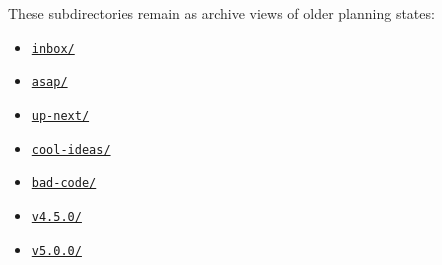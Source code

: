 These subdirectories remain as archive views of older planning states:

\begin{itemize}
\tightlist
\item
  \href{https://github.com/flyingrobots/bijou/blob/cbd70612140e7a450d764b3c7be1c6af878b99bc/docs/method/graveyard/legacy-backlog/inbox/README.md}{\texttt{i\allowbreak{}n\allowbreak{}b\allowbreak{}o\allowbreak{}x\allowbreak{}/}}
\item
  \href{https://github.com/flyingrobots/bijou/blob/cbd70612140e7a450d764b3c7be1c6af878b99bc/docs/method/graveyard/legacy-backlog/asap/README.md}{\texttt{a\allowbreak{}s\allowbreak{}a\allowbreak{}p\allowbreak{}/}}
\item
  \href{https://github.com/flyingrobots/bijou/blob/cbd70612140e7a450d764b3c7be1c6af878b99bc/docs/method/graveyard/legacy-backlog/up-next/README.md}{\texttt{u\allowbreak{}p\allowbreak{}-\allowbreak{}n\allowbreak{}e\allowbreak{}x\allowbreak{}t\allowbreak{}/}}
\item
  \href{https://github.com/flyingrobots/bijou/blob/cbd70612140e7a450d764b3c7be1c6af878b99bc/docs/method/graveyard/legacy-backlog/cool-ideas/README.md}{\texttt{c\allowbreak{}o\allowbreak{}o\allowbreak{}l\allowbreak{}-\allowbreak{}i\allowbreak{}d\allowbreak{}e\allowbreak{}a\allowbreak{}s\allowbreak{}/}}
\item
  \href{https://github.com/flyingrobots/bijou/blob/cbd70612140e7a450d764b3c7be1c6af878b99bc/docs/method/graveyard/legacy-backlog/bad-code/README.md}{\texttt{b\allowbreak{}a\allowbreak{}d\allowbreak{}-\allowbreak{}c\allowbreak{}o\allowbreak{}d\allowbreak{}e\allowbreak{}/}}
\item
  \href{https://github.com/flyingrobots/bijou/blob/cbd70612140e7a450d764b3c7be1c6af878b99bc/docs/method/graveyard/legacy-backlog/v4.5.0/README.md}{\texttt{v\allowbreak{}4\allowbreak{}.\allowbreak{}5\allowbreak{}.\allowbreak{}0\allowbreak{}/}}
\item
  \href{https://github.com/flyingrobots/bijou/blob/cbd70612140e7a450d764b3c7be1c6af878b99bc/docs/method/graveyard/legacy-backlog/v5.0.0/README.md}{\texttt{v\allowbreak{}5\allowbreak{}.\allowbreak{}0\allowbreak{}.\allowbreak{}0\allowbreak{}/}}
\end{itemize}

